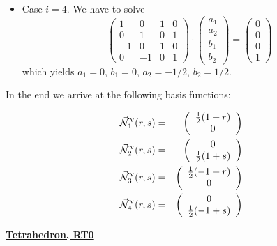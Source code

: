 \begin{itemize}
\item Case $i=4$. We have to solve
\[
\left(\begin{array}{cccc}
1 & 0 & 1 & 0 \\
0 & 1 & 0 & 1 \\
-1 & 0 & 1 & 0\\
0 & -1 & 0 & 1
\end{array}\right)
\cdot
\left(\begin{array}{c}
a_1 \\ a_2 \\ b_1 \\ b_2
\end{array}\right)
=
\left(\begin{array}{c}
0 \\ 0 \\ 0 \\ 1
\end{array}\right)
\]
which yields 
$a_1=0$, $b_1=0$, $a_2=-1/2$, $b_2=1/2$.

\end{itemize}

In the end we arrive at the following basis functions:

\begin{mdframed}[backgroundcolor=blue!5]
\begin{eqnarray}
\vec{{\mathcal{N}}}^\upnu_1 (r,s) &=& 
\left(\begin{array}{c} \frac12 (1+r) \\ 0 \end{array}\right) \nonumber\\
\vec{{\mathcal{N}}}^\upnu_2 (r,s) &=& 
\left(\begin{array}{c} 0 \\ \frac12 (1+s)  \end{array}\right) \nonumber\\
\vec{{\mathcal{N}}}^\upnu_3 (r,s) &=& 
\left(\begin{array}{c} \frac12 (-1+r) \\ 0 \end{array}\right) \nonumber\\
\vec{{\mathcal{N}}}^\upnu_4 (r,s) &=& 
\left(\begin{array}{c} 0 \\ \frac12 (-1+s)  \end{array}\right)
\end{eqnarray}
\end{mdframed}



\underline{\bf Tetrahedron, RT0}


